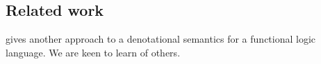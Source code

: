 \subsection{Related work}

\cite{christiansen:denotational} gives another approach to a denotational semantics
for a functional logic language.  We are keen to learn of others.



